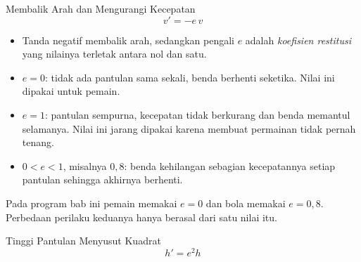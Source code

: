 \documentclass[aspectratio=169,10pt]{beamer}
\begin{document}
\begin{frame}{Membalik Arah dan Mengurangi Kecepatan}
\[
  v' = -e\,v
\]
\begin{itemize}
  \item Tanda negatif membalik arah, sedangkan pengali $e$ adalah
        \emph{koefisien restitusi} yang nilainya terletak antara nol dan satu.
  \item $e = 0$: tidak ada pantulan sama sekali, benda berhenti seketika.
        Nilai ini dipakai untuk pemain.
  \item $e = 1$: pantulan sempurna, kecepatan tidak berkurang dan benda
        memantul selamanya. Nilai ini jarang dipakai karena membuat permainan
        tidak pernah tenang.
  \item $0 < e < 1$, misalnya $0{,}8$: benda kehilangan sebagian kecepatannya
        setiap pantulan sehingga akhirnya berhenti.
\end{itemize}
\begin{kotak}
Pada program bab ini pemain memakai $e = 0$ dan bola memakai $e = 0{,}8$.
Perbedaan perilaku keduanya hanya berasal dari satu nilai itu.
\end{kotak}
\end{frame}

\begin{frame}{Tinggi Pantulan Menyusut Kuadrat}
\[
  h' = e^2 h
\]
\vspace{0.04cm}
\centering
{}
\par
{}
\end{frame}
\end{document}
